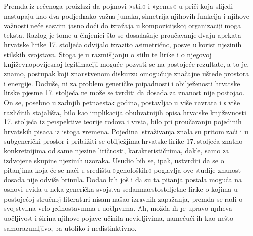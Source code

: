 \documentclass[a4paper,12pt,twoside]{report}
\begin{document}
Premda iz rečenoga proizlazi da pojmovi »stil« i »genus« u priči koja slijedi nastupaju kao dva podjednako važna junaka, simetrija njihovih funkcija i njihove važnosti neće sasvim jasno doći do izražaja u kompozicijskoj organizaciji moga teksta. Razlog je tome u činjenici što se dosadašnje proučavanje dvaju apekata hrvatske lirike 17. stoljeća odvijalo izrazito asimetrično, posve u korist njezinih stilskih svojstava. Stoga je u razmišljanju o stilu te lirike i o njegovoj književnopovijesnoj legitimaciji moguće pozvati se na postojeće rezultate, a to je, znamo, postupak koji znanstvenom diskurzu omogućuje značajne uštede prostora i energije. Doduše, ni za problem generičke pripadnosti i obilježenosti hrvatske lirske pjesme 17. stoljeća ne može se tvrditi da dosada za znanost nije postojao. On se, posebno u zadnjih petnaestak godina, postavljao u više navrata i s više različitih stajališta, bilo kao implikacija obuhvatnijih opisa hrvatske književnosti 17. stoljeća iz perspektive teorije rodova i vrsta, bilo pri proučavanju pojedinih hrvatskih pisaca iz istoga vremena. Pojedina istraživanja znala su pritom zaći i u subgenerički prostor i približiti se obilježjima hrvatske lirike 17. stoljeća znatno konkretnijima od same njezine liričnosti, karakterističnima, dakle, samo za izdvojene skupine njezinih uzoraka. Usudio bih se, ipak, ustvrditi da se o pitanjima koja će se naći u središtu »genoloških« poglavlja ove studije znanost dosada nije odviše brinula. Dodao bih još i da su ta pitanja postala moguća na osnovi uvida u neka generička svojstva sedamnaestostoljetne lirike o kojima u postojećoj stručnoj literaturi nisam našao izravnih zapažanja, premda se radi o svojstvima vrlo jednostavnima i uočljivima. Ali, možda ih je upravo njihova uočljivost i širina njihove pojave učinila nevidljivima, namećući ih kao nešto samorazumljivo, pa utoliko i nedistinktivno. 
\end{document}
